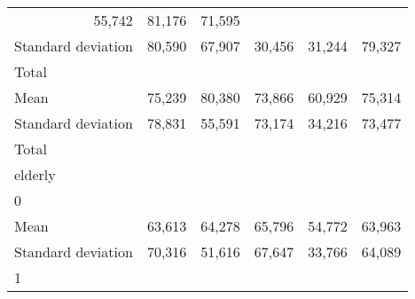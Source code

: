 \begin{tabular}{llllll}
  \multicolumn{1}{r}{55,742} &
  \multicolumn{1}{r}{81,176} &
  \multicolumn{1}{r}{71,595} \\
\multicolumn{1}{l}{\hspace{4em}Standard deviation} &
  \multicolumn{1}{|r}{80,590} &
  \multicolumn{1}{r}{67,907} &
  \multicolumn{1}{r}{30,456} &
  \multicolumn{1}{r}{31,244} &
  \multicolumn{1}{r}{79,327} \\
\multicolumn{1}{l}{\hspace{3em}Total} &
  \multicolumn{1}{|r}{} &
  \multicolumn{1}{r}{} &
  \multicolumn{1}{r}{} &
  \multicolumn{1}{r}{} &
  \multicolumn{1}{r}{} \\
\multicolumn{1}{l}{\hspace{4em}Mean} &
  \multicolumn{1}{|r}{75,239} &
  \multicolumn{1}{r}{80,380} &
  \multicolumn{1}{r}{73,866} &
  \multicolumn{1}{r}{60,929} &
  \multicolumn{1}{r}{75,314} \\
\multicolumn{1}{l}{\hspace{4em}Standard deviation} &
  \multicolumn{1}{|r}{78,831} &
  \multicolumn{1}{r}{55,591} &
  \multicolumn{1}{r}{73,174} &
  \multicolumn{1}{r}{34,216} &
  \multicolumn{1}{r}{73,477} \\
\multicolumn{1}{l}{\hspace{1em}Total} &
  \multicolumn{1}{|r}{} &
  \multicolumn{1}{r}{} &
  \multicolumn{1}{r}{} &
  \multicolumn{1}{r}{} &
  \multicolumn{1}{r}{} \\
\multicolumn{1}{l}{\hspace{2em}elderly} &
  \multicolumn{1}{|r}{} &
  \multicolumn{1}{r}{} &
  \multicolumn{1}{r}{} &
  \multicolumn{1}{r}{} &
  \multicolumn{1}{r}{} \\
\multicolumn{1}{l}{\hspace{3em}0} &
  \multicolumn{1}{|r}{} &
  \multicolumn{1}{r}{} &
  \multicolumn{1}{r}{} &
  \multicolumn{1}{r}{} &
  \multicolumn{1}{r}{} \\
\multicolumn{1}{l}{\hspace{4em}Mean} &
  \multicolumn{1}{|r}{63,613} &
  \multicolumn{1}{r}{64,278} &
  \multicolumn{1}{r}{65,796} &
  \multicolumn{1}{r}{54,772} &
  \multicolumn{1}{r}{63,963} \\
\multicolumn{1}{l}{\hspace{4em}Standard deviation} &
  \multicolumn{1}{|r}{70,316} &
  \multicolumn{1}{r}{51,616} &
  \multicolumn{1}{r}{67,647} &
  \multicolumn{1}{r}{33,766} &
  \multicolumn{1}{r}{64,089} \\
\multicolumn{1}{l}{\hspace{3em}1} &

\end{tabular}
